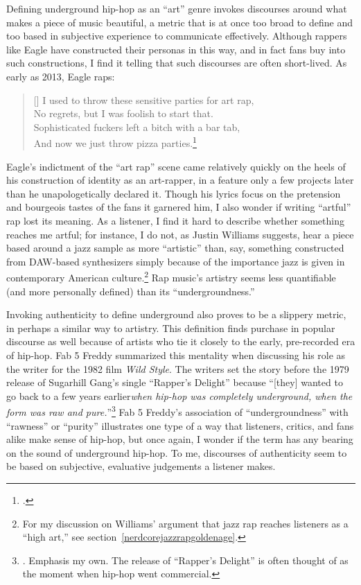Defining underground hip-hop as an ``art'' genre invokes discourses around what makes a piece of
music beautiful, a metric that is at once too broad to define and too based in subjective experience
to communicate effectively. Although rappers like Eagle have constructed their personas in this way,
and in fact fans buy into such constructions, I find it telling that such discourses are often
short-lived. As early as 2013, Eagle raps:

\settowidth{\versewidth}{I used to throw these sensitive parties for art rap,}
    \begin{verse}[\versewidth]
        I used to throw these sensitive parties for art rap, \\
        No regrets, but I was foolish to start that. \\
        Sophisticated fuckers left a bitch with a bar tab, \\
        And now we just throw pizza parties.\footnote{
        \cite{milo2013}.}
    \end{verse}
Eagle's indictment of the ``art rap'' scene came relatively quickly on the heels of his construction of
identity as an art-rapper, in a feature only a few projects later than he unapologetically declared
it. Though his lyrics focus on the pretension and bourgeois tastes of the fans it garnered him, I also 
wonder if writing ``artful'' rap lost its meaning. As a listener, I find it hard to describe whether
something reaches me artful; for instance, I do not, as Justin Williams suggests, hear a piece based around
a jazz sample as more ``artistic'' than, say, something constructed from DAW-based synthesizers simply
because of the importance jazz is given in contemporary American culture.\footnote{
    For my discussion on Williams' argument that jazz rap reaches listeners as a ``high art,'' see
    section~\ref{nerdcorejazzrapgoldenage}.} 
Rap music's artistry seems less quantifiable (and more personally defined) than its ``undergroundness.''

Invoking authenticity to define underground also proves to be a slippery metric, in perhaps a similar way
to artistry. This definition finds purchase in popular discourse as well because of artists who tie it
closely to the early, pre-recorded era of hip-hop. Fab 5 Freddy summarized this mentality when discussing 
his role as the writer for the 1982 film \textit{Wild Style}. The writers set the story before the 1979
release of Sugarhill Gang's single ``Rapper's Delight'' because ``[they] wanted to go back to a few years 
earlier\textellipsis \emph{when hip-hop was completely underground, when the form was raw and pure.}''\footnote{
    \autocite[23]{justinawilliamsRhyminStealinMusical2013}. Emphasis my own. The release
    of ``Rapper's Delight'' is often thought of as the moment when hip-hop went commercial.}
Fab 5 Freddy's association of ``undergroundness'' with ``rawness'' or ``purity'' illustrates one type
of a way that listeners, critics, and fans alike make sense of hip-hop, but once again, I wonder if the
term has any bearing on the sound of underground hip-hop. To me, discourses of authenticity seem to be
based on subjective, evaluative judgements a listener makes.

